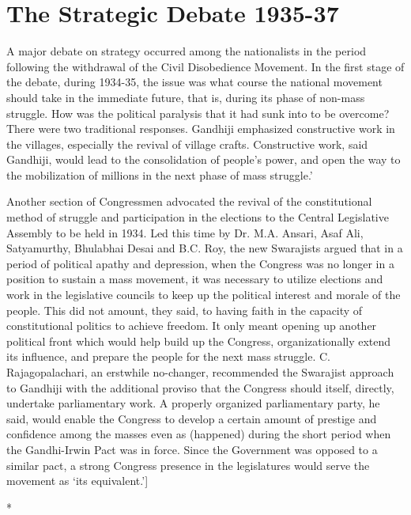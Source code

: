 \cleardoublepage
\chapter{The Strategic Debate 1935-37}



A major debate on strategy occurred among the nationalists in the period following the withdrawal of the Civil Disobedience Movement. In the first stage of the debate, during 1934-35, the issue was what course the national movement should take in the immediate future, that is, during its phase of non-mass struggle. How was the political paralysis that it had sunk into to be overcome? There were two traditional responses. Gandhiji emphasized constructive work in the villages, especially the revival of village crafts. Constructive work, said Gandhiji, would lead to the consolidation of people's power, and open the way to the mobilization of millions in the next phase of mass struggle.' 

Another section of Congressmen advocated the revival of the constitutional method of struggle and participation in the elections to the Central Legislative Assembly to be held in 1934. Led this time by Dr. M.A. Ansari, Asaf Ali, Satyamurthy, Bhulabhai Desai and B.C. Roy, the new Swarajists argued that in a period of political apathy and depression, when the Congress was no longer in a position to sustain a mass movement, it was necessary to utilize elections and work in the legislative councils to keep up the political interest and morale of the people. This did not amount, they said, to having faith in the capacity of constitutional politics to achieve freedom. It only meant opening up another political front which would help build up the Congress, organizationally extend its influence, and prepare the people for the next mass struggle. C. Rajagopalachari, an erstwhile no-changer, recommended the Swarajist approach to Gandhiji with the additional proviso that the Congress should itself, directly, undertake parliamentary work. A properly organized parliamentary party, he said, would enable the Congress to develop a certain amount of prestige and confidence among the masses even as (happened) during the short period when the Gandhi-Irwin Pact was in force. Since the Government was opposed to a similar pact, a strong Congress presence in the legislatures would serve the movement as `its equivalent.']

\begin{center}*\end{center}

